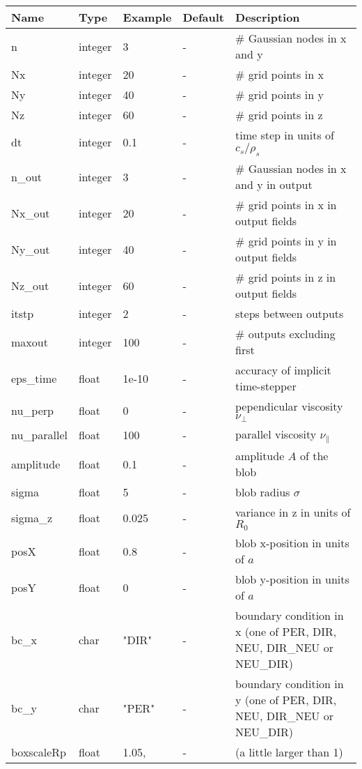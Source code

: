 \begin{longtable}{llll>{\RaggedRight}p{7cm}}
\toprule
\rowcolor{gray!50}\textbf{Name} &  \textbf{Type} & \textbf{Example} & \textbf{Default} & \textbf{Description}  \\ \midrule
n      & integer & 3 & - &\# Gaussian nodes in x and y \\
Nx     & integer &20& - &\# grid points in x \\
Ny     & integer &40& - &\# grid points in y \\
Nz     & integer &60& - &\# grid points in z \\
dt     & integer &0.1& - &time step in units of $c_s/\rho_s$ \\
n\_out  & integer &3  & - &\# Gaussian nodes in x and y in output \\
Nx\_out & integer &20& - &\# grid points in x in output fields \\
Ny\_out & integer &40& - &\# grid points in y in output fields \\
Nz\_out & integer &60& - &\# grid points in z in output fields \\
itstp  & integer &2  & - &   steps between outputs \\
maxout & integer &100& - &      \# outputs excluding first \\
eps\_time  & float &1e-10   & - & accuracy of implicit time-stepper \\
nu\_perp    & float &0   & - & pependicular viscosity $\nu_\perp$ \\
nu\_parallel    & float &100   & - & parallel viscosity $\nu_\parallel$ \\
amplitude  & float &0.1    & - & amplitude $A$ of the blob \\
sigma      & float &5     & - & blob radius $\sigma$ \\
sigma\_z   & float &0.025  & - & variance in z in units of $R_0$ \\
posX       & float &0.8    & - & blob x-position in units of $a$\\
posY       & float &0    & - & blob y-position in units of $a$\\
bc\_x   & char & "DIR"      & - & boundary condition in x (one of PER, DIR, NEU, DIR\_NEU or NEU\_DIR) \\
bc\_y   & char & "PER"      & - & boundary condition in y (one of PER, DIR, NEU, DIR\_NEU or NEU\_DIR) \\
  boxscaleRp & float &  1.05, & - & (a little larger than 1) \\

\end{longtable}
